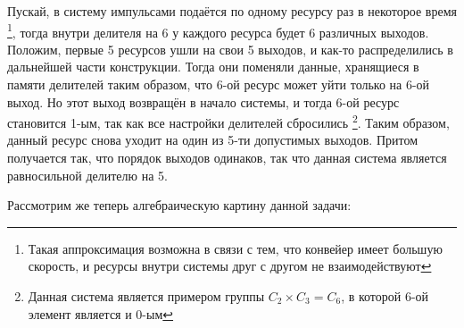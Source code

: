 Пускай, в систему импульсами подаётся по одному ресурсу раз в некоторое время%
\footnote{Такая аппроксимация возможна в связи с тем, что конвейер имеет большую скорость, и ресурсы внутри системы друг с другом не взаимодействуют},
тогда внутри делителя на 6 у каждого ресурса будет 6 различных выходов. Положим, первые 5 ресурсов ушли на свои 5 выходов, и как-то распределились в дальнейшей части конструкции. Тогда они поменяли данные, хранящиеся в памяти делителей таким образом, что 6-ой ресурс может уйти только на 6-ой выход. Но этот выход возвращён в начало системы, и тогда 6-ой ресурс становится 1-ым, так как все настройки делителей сбросились%
\footnote{Данная система является примером группы $C_2 \times C_3 = C_6$, в которой 6-ой элемент является и 0-ым}.
Таким образом, данный ресурс снова уходит на один из 5-ти допустимых выходов. Притом получается так, что порядок выходов одинаков, так что данная система является равносильной делителю на 5.



\vspace{0.3in}

\noindent Рассмотрим же теперь алгебраическую картину данной задачи:

\vspace{0.3in}


